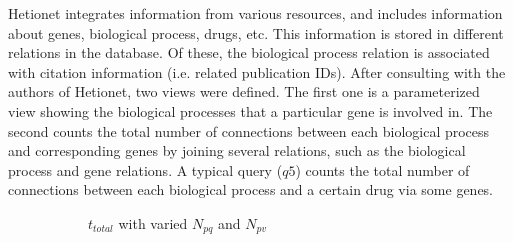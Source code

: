 Hetionet integrates information from various resources, and includes information about genes, biological process, drugs, etc.  This information is stored in different relations in the database. Of these, the biological process relation is associated with citation information (i.e. related publication IDs). After consulting with the authors of Hetionet, two views were defined. The first one is a parameterized view showing the  biological processes that a particular gene is involved in. The second counts the total number of connections between each biological process and corresponding genes by joining several relations, such as the biological process and gene relations.  A typical query ($q5$) counts the total number of connections between each biological process and a certain drug via some genes.

\begin{figure}
\captionsetup[subfigure]{width=1\textwidth}
     \centering
    \begin{subfigure}{0.30\textwidth}
    \hspace*{-0.8cm}
        \caption{$t_{total}$ with varied $N_{pq}$ and $N_{pv}$}     \label{fig:stress_test_instance_size}
    \end{subfigure}
    \hfill
    \begin{subfigure}{0.30\textwidth}
    \hspace*{-0.8cm}

\end{subfigure}
\end{figure}
